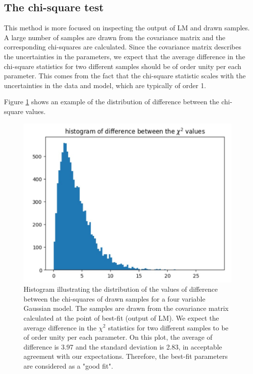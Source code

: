 \documentclass[12pt, TexShade, letterpaper]{report}
\begin{document}
\subsection{The chi-square test}
\label{chap:method,sub:test,subsub:chi}
This method is more focused on inspecting the output of LM and drawn samples. A large number of samples are drawn from the covariance matrix and the corresponding chi-squares are calculated. Since the covariance matrix describes the uncertainties in the parameters, we expect that the average difference in the chi-square statistics for two different samples should be of order unity per each parameter. This comes from the fact that the chi-square statistic scales with the uncertainties in the data and model, which are typically of order 1.\par
Figure \ref{fig:csq_test} shows an example of the distribution of difference between the chi-square values.\par
\begin{figure}[h!]
\centering
\includegraphics[scale =0.9]{chi-sqaure test.jpg}
\caption[Histogram of difference in the chi-square values of drawn samples]{Histogram illustrating the distribution of the values of difference between the chi-squares of drawn samples for a four variable Gaussian model. The samples are drawn from the covariance matrix calculated at the point of best-fit (output of LM). We expect the average difference in the $\chi^2$ statistics for two different samples to be of order unity per each parameter.
On this plot, the average of difference is 3.97 and the standard deviation is 2.83, in acceptable agreement with our expectations. Therefore, the best-fit parameters are considered as a "good fit".}
\label{fig:csq_test}
\end{figure}
\end{document}
